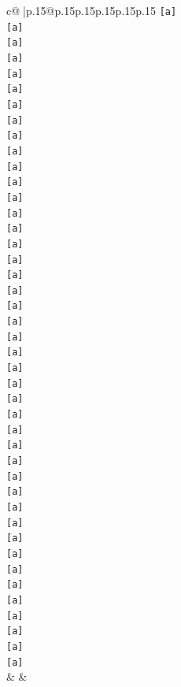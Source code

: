 \documentclass{article}
\begin{document}
{\begin{supertabular}{c@{$\;$}|p{.15\linewidth}@{}p{.15\linewidth}p{.15\linewidth}p{.15\linewidth}p{.15\linewidth}p{.15\linewidth}}
{{{\texttt{{[}a{]}} \\
\texttt{{[}a{]}} \\
\texttt{{[}a{]}} \\
\texttt{{[}a{]}} \\
\texttt{{[}a{]}} \\
\texttt{{[}a{]}} \\
\texttt{{[}a{]}} \\
\texttt{{[}a{]}} \\
\texttt{{[}a{]}} \\
\texttt{{[}a{]}} \\
\texttt{{[}a{]}} \\
\texttt{{[}a{]}} \\
\texttt{{[}a{]}} \\
\texttt{{[}a{]}} \\
\texttt{{[}a{]}} \\
\texttt{{[}a{]}} \\
\texttt{{[}a{]}} \\
\texttt{{[}a{]}} \\
\texttt{{[}a{]}} \\
\texttt{{[}a{]}} \\
\texttt{{[}a{]}} \\
\texttt{{[}a{]}} \\
\texttt{{[}a{]}} \\
\texttt{{[}a{]}} \\
\texttt{{[}a{]}} \\
\texttt{{[}a{]}} \\
\texttt{{[}a{]}} \\
\texttt{{[}a{]}} \\
\texttt{{[}a{]}} \\
\texttt{{[}a{]}} \\
\texttt{{[}a{]}} \\
\texttt{{[}a{]}} \\
\texttt{{[}a{]}} \\
\texttt{{[}a{]}} \\
\texttt{{[}a{]}} \\
\texttt{{[}a{]}} \\
\texttt{{[}a{]}} \\
\texttt{{[}a{]}} \\
\texttt{{[}a{]}} \\
\texttt{{[}a{]}} \\
\texttt{{[}a{]}} \\
\texttt{{[}a{]}} \\
\texttt{{[}a{]}} \\
            }
        }
    }
    & & \\ \\


\end{supertabular}}
\end{document}
